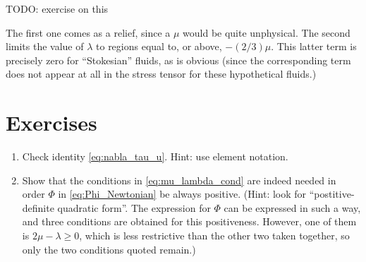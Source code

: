 TODO: exercise on this

The first one comes as a relief, since a $\mu$ would be quite
unphysical. The second limits the value of $\lambda$ to regions equal
to, or above, $ - (2/3) \mu$. This latter term is precisely zero for
``Stokesian'' fluids, as is obvious (since the corresponding term does
not appear at all in the stress tensor for these hypothetical fluids.)

\section{Exercises}

\begin{enumerate}
\item Check identity \ref{eq:nabla_tau_u}. Hint: use element notation.
\item Show that the conditions in \ref{eq:mu_lambda_cond} are indeed
  needed in order $\Phi$ in \ref{eq:Phi_Newtonian} be always
  positive. (Hint: look for ``postitive-definite quadratic form''. The
  expression for $\Phi$ can be expressed in such a way, and three
  conditions are obtained for this positiveness. However, one of them
  is $2\mu-\lambda \ge 0$, which is less restrictive than the other
  two taken together, so only the two conditions quoted remain.)
\end{enumerate}

